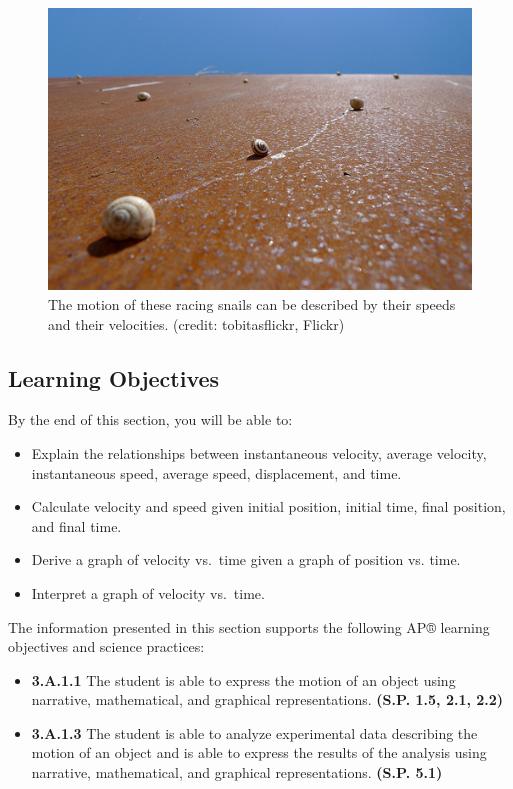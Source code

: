 \documentclass[
]{book}
\providecommand{\tightlist}{%
  \setlength{\itemsep}{0pt}\setlength{\parskip}{0pt}}
\newenvironment{learning-objectives}{}{}
\begin{document}
\begin{figure}
\hypertarget{import-auto-id1690049}{%
\centering
\includegraphics{images/Picture 6.png}
\caption{The motion of these racing snails can be described by their speeds and
their velocities. (credit: tobitasflickr,
Flickr)}\label{import-auto-id1690049}
}
\end{figure}

\hypertarget{fs-id1037368}{}
\begin{learning-objectives}

\hypertarget{learning-objectives-1}{%
\subsection{Learning Objectives}\label{learning-objectives-1}}

By the end of this section, you will be able to:

\begin{itemize}
\tightlist
\item
  Explain the relationships between instantaneous velocity, average
  velocity, instantaneous speed, average speed, displacement, and
  time.
\item
  Calculate velocity and speed given initial position, initial time,
  final position, and final time.
\item
  Derive a graph of velocity vs.~time given a graph of position vs.
  time.
\item
  Interpret a graph of velocity vs.~time.
\end{itemize}

The information presented in this section supports the following AP®
learning objectives and science practices:

\begin{itemize}
\tightlist
\item
  \textbf{3.A.1.1} The student is able to express the motion of an object
  using narrative, mathematical, and graphical representations.
  \textbf{(S.P. 1.5, 2.1, 2.2)}
\item
  \textbf{3.A.1.3} The student is able to analyze experimental data
  describing the motion of an object and is able to express the
  results of the analysis using narrative, mathematical, and graphical
  representations. \textbf{(S.P. 5.1)}
\end{itemize}

\end{learning-objectives}
\end{document}
